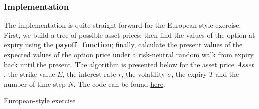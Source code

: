 \subsubsection{Implementation}
The implementation is quite straight-forward for the European-style exercise. First, we build a tree of possible asset prices; then find the values of the option at expiry using the \textbf{payoff\_function}; finally, calculate the present values of the expected values of the option price under a risk-neutral random walk from expiry back until the present. The algorithm is presented below for the asset price $Asset$, the strike value $E$, the interest rate $r$, the volatility $\sigma$, the expiry $T$ and the number of time step $N$. The code can be found \href{https://github.com/chitn/quantfin_study/blob/master/code/binomial_model.py}{here}. 

\vspace{\baselineskip}
\begin{algorithm}[H]
\caption{European-style exercise}
\label{algo:binomial_european}  
\end{algorithm}
\vspace{\baselineskip}

